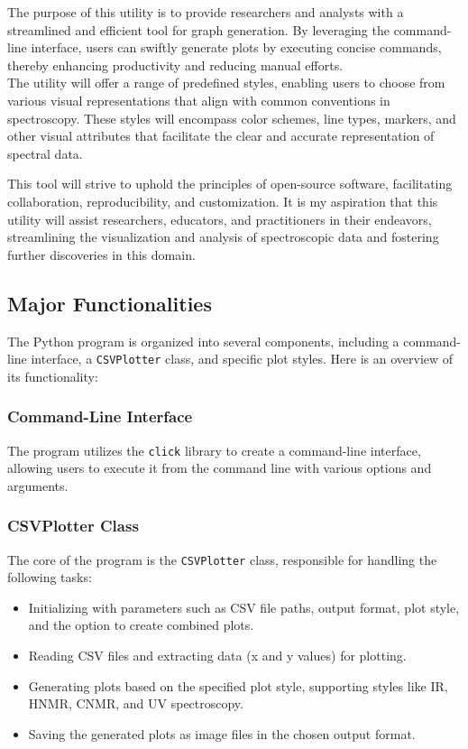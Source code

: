 \documentclass[../Master.tex]{subfiles}
\begin{document}
The purpose of this utility is to provide researchers and analysts with a streamlined and efficient tool for graph generation. By leveraging the command-line interface, users can swiftly generate plots by executing concise commands, thereby enhancing productivity and reducing manual efforts. \\
The utility will offer a range of predefined styles, enabling users to choose from various visual representations that align with common conventions in spectroscopy. These styles will encompass color schemes, line types, markers, and other visual attributes that facilitate the clear and accurate representation of spectral data.

This tool will strive to uphold the principles of open-source software, facilitating collaboration, reproducibility, and customization. It is my aspiration that this utility will assist researchers, educators, and practitioners in their endeavors, streamlining the visualization and analysis of spectroscopic data and fostering further discoveries in this domain.

\subsection{Major Functionalities}


The Python program is organized into several components, including a command-line interface, a \texttt{CSVPlotter} class, and specific plot styles. Here is an overview of its functionality:

\subsubsection{Command-Line Interface}

The program utilizes the \texttt{click} library to create a command-line interface, allowing users to execute it from the command line with various options and arguments.

\subsubsection{CSVPlotter Class}

The core of the program is the \texttt{CSVPlotter} class, responsible for handling the following tasks:

\begin{itemize}
	\item Initializing with parameters such as CSV file paths, output format, plot style, and the option to create combined plots.
	\item Reading CSV files and extracting data (x and y values) for plotting.
	\item Generating plots based on the specified plot style, supporting styles like IR, HNMR, CNMR, and UV spectroscopy.
	\item Saving the generated plots as image files in the chosen output format.
\end{itemize}
\end{document}
